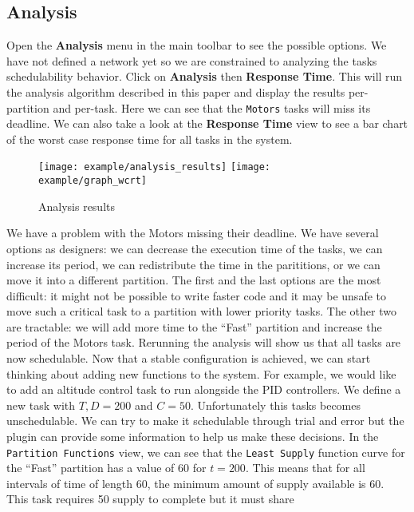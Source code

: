 \subsection{Analysis}
Open the \textbf{Analysis} menu in the main
toolbar to see the possible options.
We have not defined a network yet so we are constrained to analyzing
the tasks schedulability behavior.
Click on \textbf{Analysis} then \textbf{Response Time}.
This will run the analysis algorithm described in this paper
and display the results per-partition and per-task.
Here we can see that the \texttt{Motors} tasks will miss its deadline.
We can also take a look at the \textbf{Response Time} view to see
a bar chart of the worst case response time for all tasks in the system.
\begin{figure}[H]
    \centering
    \texttt{[image: example/analysis\_results]}
    \texttt{[image: example/graph\_wcrt]}
    \caption{Analysis results}
\end{figure}
We have a problem with the Motors missing their deadline. We have several
options as designers: we can decrease the execution time of the tasks,
we can increase its period, we can redistribute the time in the parititions,
or we can move it into a different partition.
The first and the last options are the most difficult: it might not be
possible to write faster code and it may be unsafe to move such a critical
task to a partition with lower priority tasks. The other two are tractable:
we will add more time to the ``Fast'' partition and increase the period
of the Motors task. Rerunning the analysis will show us that all tasks
are now schedulable.
Now that a stable configuration is achieved, we can start thinking about 
adding new functions to the system. For example, we would like to add an
altitude control task to run alongside the PID controllers.
We define a new task with $T,D = 200$ and $C = 50$. Unfortunately this
tasks becomes unschedulable.
We can try to make it schedulable through trial and error but the plugin
can provide some information to help us make these decisions.
In the \texttt{Partition Functions} view, we can see that the \texttt{Least Supply}
function curve for the ``Fast'' partition has a value of 60 for $t = 200$. This
means that for all intervals of time of length 60, the minimum amount of supply
available is 60. This task requires 50 supply to complete but it must share
